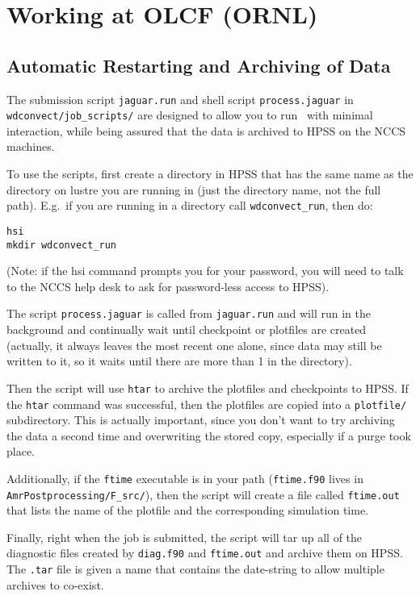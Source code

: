 \section{Working at OLCF (ORNL)}

\subsection{Automatic Restarting and Archiving of Data}

The submission script {\tt jaguar.run} and shell script
{\tt process.jaguar} in {\tt wdconvect/job\_scripts/}
are designed to allow you to run \maestro\ with minimal interaction,
while being assured that the data is archived to HPSS on the NCCS
machines.

To use the scripts, first create a directory in HPSS that has the same
name as the directory on lustre you are running in (just the directory
name, not the full path).  E.g.\ if you are running in a directory
call {\tt wdconvect\_run}, then do:
\begin{verbatim}
hsi
mkdir wdconvect_run
\end{verbatim}
(Note: if the hsi command prompts you for your password, you will need to
talk to the NCCS help desk to ask for password-less access to HPSS).

The script {\tt process.jaguar} is called from {\tt jaguar.run} and
will run in the background and continually wait until checkpoint or
plotfiles are created (actually, it always leaves the most recent one
alone, since data may still be written to it, so it waits until there
are more than 1 in the directory).

Then the script will use {\tt htar} to archive the plotfiles and checkpoints
to HPSS.  If the {\tt htar} command was successful, then the plotfiles are
copied into a {\tt plotfile/} subdirectory.  This is actually important,
since you don't want to try archiving the data a second time and
overwriting the stored copy, especially if a purge took place.

Additionally, if the {\tt ftime} executable is in your path 
({\tt ftime.f90} lives in {\tt AmrPostprocessing/F\_src/}), then the
script will create a file called {\tt ftime.out} that lists the name of the
plotfile and the corresponding simulation time.

Finally, right when the job is submitted, the script will tar up all
of the diagnostic files created by {\tt diag.f90} and {\tt ftime.out}
and archive them on HPSS.  The {\tt .tar} file is given a name that
contains the date-string to allow multiple archives to co-exist.


